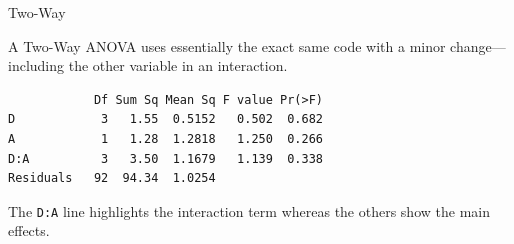\begin{frame}[fragile]{Two-Way}

A Two-Way ANOVA uses essentially the exact same code with a minor
change---including the other variable in an interaction.

\begin{Shaded}
\begin{Highlighting}[]
\StringTok{ }\OperatorTok{~}\StringTok{ }\OperatorTok{*}\StringTok{ }
\end{Highlighting}
\end{Shaded}

\begin{verbatim}
            Df Sum Sq Mean Sq F value Pr(>F)
D            3   1.55  0.5152   0.502  0.682
A            1   1.28  1.2818   1.250  0.266
D:A          3   3.50  1.1679   1.139  0.338
Residuals   92  94.34  1.0254               
\end{verbatim}

The \texttt{D:A} line highlights the interaction term whereas the others
show the main effects.

\end{frame}

